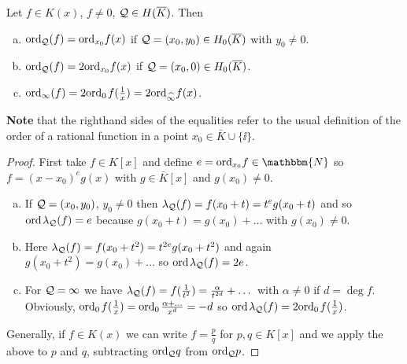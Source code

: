 \documentclass[english,11pt,a4paper]{article}
\begin{document}
\begin{lemma}\label{two}
  Let $f \in K(x)$, $f \neq 0$, $\mathcal{Q} \in H(\overline K)$. Then
  \begin{enumerate}[(a)]\parskip 1mm
	  \item $\text{ord}_{\mathcal{Q}} (f) = \text{ord}_{x_0} f(x)$ if $\mathcal{Q} = (x_0,y_0) \in H_0(\overline K)$ with $y_0 \neq 0$.
	  \item $\text{ord}_{\mathcal{Q}} (f) = 2 \text{ord}_{x_0} f(x)$ if $\mathcal{Q} = (x_0,0) \in H_0(\overline K)$.
	  \item $\text{ord}_{\infty} (f) = 2 \text{ord}_0\hspace{0.4mm} f(\frac{1}{x}) = 2 \text{ord}_{\widehat{\infty}} f(x)$.
	\end{enumerate}\parskip 3mm
	\textbf{Note} that the righthand sides of the equalities refer to the usual definition of the order of a rational function in a point $x_0 \in \bar K \cup \{ \ii \}$.%
	\begin{proof}
		First take $f \in K[x]$ and define $e = \ordx f \in \mathbbm{N}$ so $f = (x-x_0)^e g(x)$ with $g \in \bar K[x]$ and $g(x_0)\neq 0$.
		\begin{enumerate}[(a)]
	  	\item If $\mathcal{Q} =(x_0,y_0)$, $y_0 \neq 0$ then $\lambda_{\mathcal{Q}} (f) = f(x_0 + t) = t^e g(x_0 + t)$ and so $\text{ord\hspace{0.4mm}} \lambda_{\mathcal{Q}} (f) = e$ because $g(x_0 + t) = g(x_0) + \dots$ with $g(x_0) \neq 0$.

	  	\item Here $\lambda_{\mathcal{Q}} (f) = f(x_0 + t^2) = t^{2e} g(x_0 + t^2)$ and again $g(x_0 + t^2) = g(x_0) + \dots$ so $\text{ord\hspace{0.4mm}} \lambda_{\mathcal{Q}} (f) = 2e$.

	  	\item For $\mathcal{Q} = \infty$ we have $\lambda_{\mathcal{Q}} (f) = f(\frac{1}{t^2}) = \frac{\alpha}{t^{2d}}+ \dots$ with $\alpha \neq 0$ if $d = \deg f$. Obviously, $\text{ord}_0\hspace{0.4mm} f(\frac 1 x ) = \text{ord}_0\hspace{0.4mm} \frac{\alpha + \dots}{x^d} = -d$ so $\text{ord\hspace{0.4mm}} \lambda_{\mathcal{Q}} (f) = 2 \text{ord}_0\hspace{0.4mm} f(\frac 1 x )$.
		\end{enumerate}
		Generally, if $f \in K(x)$ we can write $f = \frac p q$ for $p, q \in K[x]$ and we apply the above to $p$ and $q$, subtracting $\text{ord}_{\mathcal{Q}} q$ from $\text{ord}_{\mathcal{Q}} p$.
	\end{proof}
\end{lemma}
\end{document}
